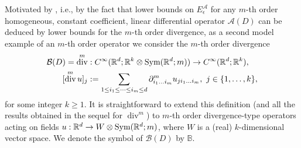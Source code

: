 \documentclass[a4paper, 10pt, twoside, notitlepage]{amsart}
\theoremstyle{plain}
\newcommand{\R}{\mathbb{R}}
\newcommand{\A}{\mathcal{A}}
\renewcommand{\S}[1]{\textup{Sym}(\R^d;#1)}
\DeclareMathOperator{\di}{div}
\begin{document}
            Motivated by \cite[Appendix B]{RRT23}, i.e., by the fact that lower bounds on $E_{\epsilon}^{\A}$ for any $m$-th order homogeneous, constant coefficient, linear differential operator $\A(D)$ can be deduced by lower bounds for the $m$-th order divergence, as a second model example of an $m$-th order operator we consider the $m$-th order divergence
            \begin{gather} \label{eq:DivergenceOp}
              \begin{aligned}
                \mathcal{B}(D) = \di^m &: C^\infty(\R^d;\R^k \otimes \S{m}) \to C^\infty(\R^d;\R^k), \\
                [\di^m u]_j & := \sum_{1\leq i_1 \leq \dots \leq i_m \leq d} \partial_{i_1 \dots i_m}^m u_{j i_1 \dots i_m}, \ j \in \{1,\dots,k\},
              \end{aligned}
            \end{gather}
            for some integer $k\ge1$.
            It is straightforward to extend this definition (and all the results obtained in the sequel for $\di^m$) to $m$-th order divergence-type operators acting on fields $u:\R^d\to W\otimes\S{m}$, where $W$ is a (real) $k$-dimensional vector space. We denote the symbol of $\mathcal{B}(D)$ by $\mathbb{B}$.
            
\end{document}
